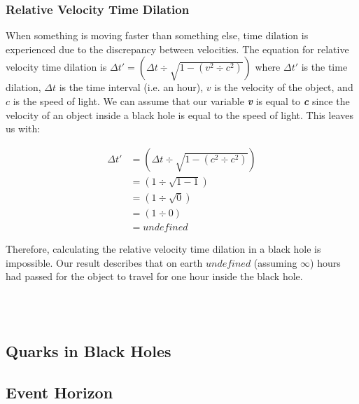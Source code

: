 \documentclass{article}
\begin{document}
\subsubsection{Relative Velocity Time Dilation}
When something is moving faster than something else, time dilation is experienced due to the discrepancy between velocities. The equation for relative velocity time dilation is $\Delta t\prime = \left(\Delta t \div \sqrt{1 - (v^2 \div c^2)}\right)$ where $\Delta t\prime$ is the time dilation, $\Delta t$ is the time interval (i.e. an hour), $v$ is the velocity of the object, and $c$ is the speed of light.
We can assume that our variable \textbf{\textit{v}} is equal to \textbf{\textit{c}} since the velocity of an object inside a black hole is equal to the speed of light. This leaves us with:\\
\vspace{-0.2cm}
\begin{minipage}{0.5\textwidth}
    \begin{align*}
        \Delta t\prime & = \left(\Delta t \div \sqrt{1 - (c^2 \div c^2)}\right) \\
                       & = \left(1 \div \sqrt{1 - 1}\right)                     \\
                       & = \left(1 \div \sqrt{0}\right)                         \\
                       & = \left(1 \div 0\right)                                \\
                       & = undefined
    \end{align*}
\end{minipage}
\begin{minipage}{0.5\textwidth}
    Therefore, calculating the relative velocity time dilation in a black hole is impossible. Our result describes that on earth $undefined$ (assuming $\infty$) hours had passed for the object to travel for one hour inside the black hole.
\end{minipage}\leavevmode\\\\

\subsection{Quarks in Black Holes}


\subsection{Event Horizon}
\end{document}
